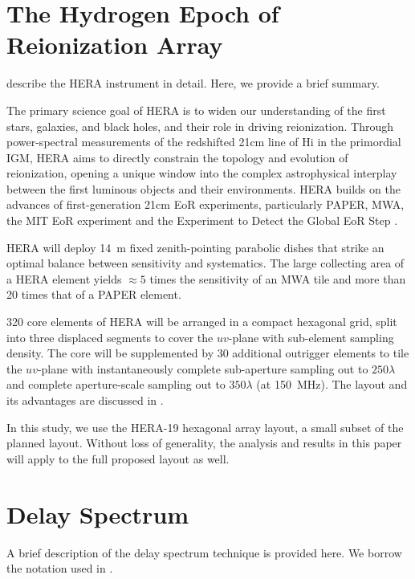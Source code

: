 \documentclass[preprint2,iop,numberedappendix,twocolappendix,appendixfloats]{emulateapj}
\begin{document}
\section{The Hydrogen Epoch of Reionization Array}\label{sec:HERA}

\citet{deb16} describe the HERA instrument in detail. Here, we provide a brief summary.

The primary science goal of HERA is to widen our understanding of the first stars, galaxies, and black holes, and their role in driving reionization. Through power-spectral measurements of the redshifted 21cm line of H{\sc i} in the primordial IGM, HERA aims to directly constrain the topology and evolution of reionization, opening a unique window into the complex astrophysical interplay between the first luminous objects and their environments. HERA builds on the advances of first-generation 21cm EoR experiments, particularly PAPER, MWA, the MIT EoR experiment \citep[MITEoR;][]{zhe14} and the Experiment to Detect the Global EoR Step \citep[EDGES;][]{bow10}.

HERA will deploy 14~m fixed zenith-pointing parabolic dishes that strike an optimal balance between sensitivity and systematics. The large collecting area of a HERA element yields $\approx 5$ times the sensitivity of an MWA tile and more than 20 times that of a PAPER element. 

320 core elements of HERA will be arranged in a compact hexagonal grid, split into three displaced segments to cover the $uv$-plane with sub-element sampling density. The core will be supplemented by 30 additional outrigger elements to tile the $uv$-plane with instantaneously complete sub-aperture sampling out to $250\lambda$ and complete aperture-scale sampling out to $350\lambda$ (at 150~MHz). The layout and its advantages are discussed in \citet{dil16}.

In this study, we use the HERA-19 hexagonal array layout, a small subset of the planned layout. Without loss of generality, the analysis and results in this paper will apply to the full proposed layout as well.

\section{Delay Spectrum}\label{sec:delay-spectrum}

A brief description of the delay spectrum technique \citep{par12a,par12b} is provided here. We borrow the notation used in \citet{thy15a}. 
\end{document}
